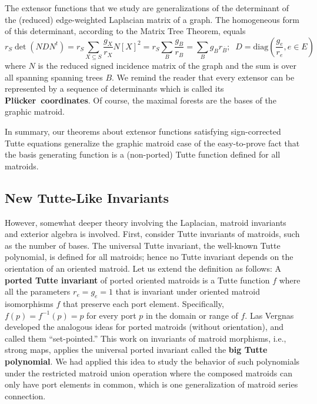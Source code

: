 \documentclass[12pt]{article}
\theoremstyle{definition}
\newcommand{\scomp}[1]{\ensuremath{\overline{#1}}}
\newcommand{\Plucker}{Pl\"{u}cker\ }
\begin{document}
The extensor functions that we study are generalizations of the determinant
of the (reduced) edge-weighted Laplacian matrix of a graph.  
The homogeneous form of this determinant, according to the Matrix Tree Theorem,
equals
\begin{equation}
\label{BasisEnumPoly}
r_S\det(NDN^t) = r_S\sum_{X\subseteq S}\frac{g_X}{r_X}N[X]^2
= r_S\sum_{B}\frac{g_B}{r_B}
= \sum_{B} g_B r_{\scomp{B}};\;\;D=\mbox{diag}(\frac{g_e}{r_e}, e\in E)
\end{equation}
where $N$ is the reduced signed incidence matrix of the graph and the sum
is over all spanning spanning trees $B$.
We remind 
the reader that every extensor can be represented by a sequence of determinants
which is called its \textbf{\Plucker coordinates}.
Of course, the maximal forests
are the bases of the graphic matroid.

In summary, our theorems about extensor functions satisfying
sign-corrected Tutte equations generalize the graphic matroid 
case of the easy-to-prove fact that the basis generating function
is a (non-ported) Tutte function defined for all matroids.  

\subsection{New Tutte-Like Invariants}


However, somewhat deeper theory involving
the Laplacian, matroid invariants and exterior algebra is 
involved.  First, consider 
Tutte invariants of matroids, such as the number of bases. 
The universal Tutte invariant, the well-known Tutte polynomial,
is defined for all matroids; hence no Tutte invariant depends
on the orientation of an oriented matroid.  Let us extend the
definition as follows:
A \textbf{ported Tutte invariant} of ported oriented matroids
is a Tutte function $f$ where all the parameters 
$r_e=g_e=1$ 
that is invariant
under oriented matroid isomorphisms $f$ that 
preserve each port element.
Specifically, $f(p)=f^{-1}(p)=p$ for every port $p$ in the
domain or range of $f$.  
Las Vergnas 
\cite{MR0419272,TPMorphMat80,SetPointedLV}
developed the analogous ideas for ported matroids (without orientation),
and called them ``set-pointed.''  This work on invariants of 
matroid morphisms, i.e., strong maps, applies the
universal ported invariant called the \textbf{big Tutte polynomial}.  
We had applied this idea to study the behavior
of such polynomials under the restricted matroid union 
operation\cite{sdcPorted} where the composed matroids can only have port elements in common, 
which is one generalization of matroid series connection.  
\end{document}
